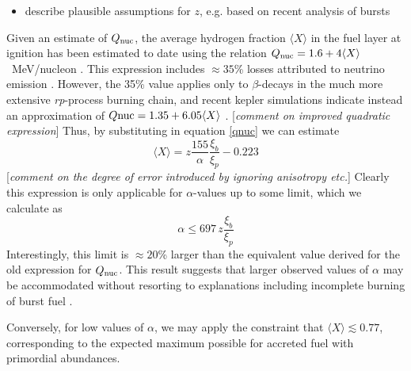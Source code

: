 \documentclass{aastex61}
\begin{document}
\begin{itemize}
\item describe plausible assumptions for $z$, e.g. based on recent analysis of bursts
\end{itemize}

Given an estimate of $Q_{\rm nuc}$, the average hydrogen fraction $\langle X\rangle$ in the fuel layer at ignition has been estimated to date using the relation $Q_{\rm nuc}=1.6 + 4\langle X\rangle$~MeV/nucleon \cite[e.g.][and references therein]{gal03d}. This expression includes $\approx35$\% losses
attributed to neutrino emission \cite[]{fuji87}. However, the 35\% value applies only to $\beta$-decays in the much more extensive {\it rp}-process burning chain, and recent {\sc kepler} simulations indicate instead an approximation of 
$Q{\rm nuc}=1.35+6.05\langle X\rangle$ 
\cite[]{goodwin19a}.
[{\it comment on improved quadratic expression}]
%
Thus, by substituting in equation \ref{qnuc} we can estimate 
\begin{equation}
\langle X\rangle 
 = z\frac{155}{\alpha}\frac{\xi_b}{\xi_p} - 0.223 \label{xbar}
\end{equation}
[{\it comment on the degree of error introduced by ignoring anisotropy etc.}] 
%
Clearly this expression is only applicable for $\alpha$-values up to some limit, which we calculate as
\begin{equation}
\alpha \leq 697\, z \frac{\xi_b}{\xi_p}
\end{equation}
Interestingly, this limit is 
$\approx20$\%
%
larger than the equivalent value derived for the old expression for $Q_{\rm nuc}$. This result suggests that larger observed values of $\alpha$ may be accommodated without resorting to explanations including incomplete burning of burst fuel \cite[e.g.][]{bcatalog}.

Conversely, for low values of $\alpha$, we may apply the constraint that $\langle X\rangle \lesssim 0.77$, corresponding to the expected maximum possible for accreted fuel with primordial abundances.
\end{document}
